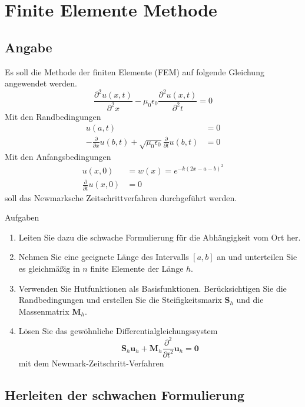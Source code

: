 \section{Finite Elemente Methode}
	
	\subsection{Angabe}
	Es soll die Methode der finiten Elemente (FEM) auf folgende Gleichung angewendet werden.
	\begin{equation}
		\frac{\partial^2 u(x,t)}{\partial ^2 x} - \mu_0 \epsilon_0 \frac{\partial ^2 u (x,t)}{\partial^2 t} = 0
	\end{equation}
	Mit den Randbedingungen
	\begin{align}
	u(a,t) &= 0 \\
	- \frac{\partial}{\partial x} u(b,t)+\sqrt{\mu_0 \epsilon_0} \frac{\partial}{\partial t} u(b,t) &= 0
	\end{align}
	Mit den Anfangsbedingungen
	\begin{align}
	u(x,0) &= w(x) = e^{-k(2x-a-b)^2} \\
	\frac{\partial}{\partial t} u(x,0) &= 0
	\end{align}
	soll das Newmarksche Zeitschrittverfahren durchgeführt werden.
	\\
	
	{\Large Aufgaben \par}
	\begin{enumerate}
		\item Leiten Sie dazu die schwache Formulierung für die Abhängigkeit vom Ort her.
		\item Nehmen Sie eine geeignete Länge des Intervalls $[a, b]$ an und unterteilen Sie es gleichmäßig in $n$ finite Elemente der Länge $h$.
		\item Verwenden Sie Hutfunktionen als Basisfunktionen. Berücksichtigen Sie die Randbedingungen und erstellen Sie die Steifigkeitsmarix $\mathbf{S}_h$ und die Massenmatrix $\mathbf{M}_h$.
		\item Lösen Sie das gewöhnliche Differentialgleichungssystem
	\[
	\mathbf{S}_h \mathbf{u}_h  + \mathbf{M}_h \frac{\partial ^2}{\partial t^2} \mathbf{u}_h = \mathbf{0}
	\]
		mit dem Newmark-Zeitschritt-Verfahren
	\end{enumerate}


	
	\subsection{Herleiten der schwachen Formulierung}
